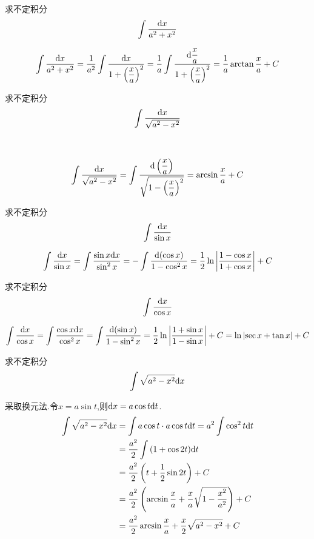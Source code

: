 \documentclass{ctexart}
\begin{document}
\begin{problem}[Example 3.]
    求不定积分$$\int{\dfrac{\mathrm{d}x}{a^2+x^2}}$$
\end{problem}
\begin{solution}[Solution.]
    $$
    \int \dfrac{\mathrm{d} x}{a^2+x^2} 
    = \dfrac{1}{a^2}\int\dfrac{\mathrm{d} x}{1+\left(\dfrac{x}{a}\right)^2}\\
    = \dfrac{1}{a}\int\dfrac{\mathrm{d}\dfrac{x}{a}}{1+\left(\dfrac{x}{a}\right)^2}\\
    = \dfrac{1}{a}\arctan{\dfrac{x}{a}}+C
    $$
\end{solution}
\begin{problem}[Example 4.]
    求不定积分$$\int{\dfrac{\mathrm{d}x}{\sqrt{a^2-x^2}}}$$
\end{problem}
\ \\
\begin{solution}[Solution.]
    $$
    \int{\dfrac{\mathrm{d}x}{\sqrt{a^2-x^2}}} 
    = \int{\dfrac{\mathrm{d}\left(\dfrac{x}{a}\right)}{\sqrt{1-\left(\dfrac{x}{a}\right)^2}}}
    = \arcsin{\dfrac{x}{a}}+C
    $$
\end{solution}
\begin{problem}[Example 5.]
    求不定积分$$\int{\dfrac{\mathrm{d}x}{\sin{x}}}$$
\end{problem}
\begin{solution}[Solution.]
    $$
    \int{\dfrac{\mathrm{d}x}{\sin x}} 
    = \int{\dfrac{\sin{x}\mathrm{d}x}{\sin^2{x}}}
    = -\int{\dfrac{\mathrm{d}(\cos{x})}{1-\cos^2{x}}}
    = \dfrac{1}{2}\ln\left\lvert\dfrac{1-\cos{x}}{1+\cos{x}}\right\rvert+C
    $$
\end{solution}
\begin{problem}[Example 6.]
    求不定积分$$\int{\dfrac{\mathrm{d}x}{\cos{x}}}$$
\end{problem}
\begin{solution}[Solution.]
    $$
    \int{\dfrac{\mathrm{d}x}{\cos x}} 
    = \int{\dfrac{\cos{x}\mathrm{d}x}{\cos^2{x}}}
    = \int{\dfrac{\mathrm{d}(\sin{x})}{1-\sin^2{x}}}
    = \dfrac{1}{2}\ln\left\lvert\dfrac{1+\sin{x}}{1-\sin{x}}\right\rvert+C
    = \ln\left\lvert\sec{x}+\tan{x}\right\rvert+C
    $$
\end{solution}
\begin{problem}[Example 7.]
    求不定积分$$\int{\sqrt{a^2-x^2}\mathrm{d}x}$$
\end{problem}
\begin{solution}
    采取换元法.令$x=a\sin{t}$,则$\mathrm{d} x=a\cos{t}\mathrm{d} t$.
    $$\begin{aligned}
        \int{\sqrt{a^2-x^2}\mathrm{d}x} 
        &= \int{a\cos{t}\cdot a\cos{t}\mathrm{d}t} = a^2\int{\cos^2{t}\mathrm{d}t} \\
        &= \dfrac{a^2}{2}\int{(1+\cos{2t})\mathrm{d}t} \\
        &= \dfrac{a^2}{2}\left(t+\dfrac{1}{2}\sin{2t}\right)+C \\
        &= \dfrac{a^2}{2}\left(\arcsin{\dfrac{x}{a}}+\dfrac{x}{a}\sqrt{1-\dfrac{x^2}{a^2}}\right)+C \\
        &= \dfrac{a^2}{2}\arcsin{\dfrac{x}{a}}+\dfrac{x}{2}\sqrt{a^2-x^2}+C
    \end{aligned}$$
\end{solution}
\end{document}

